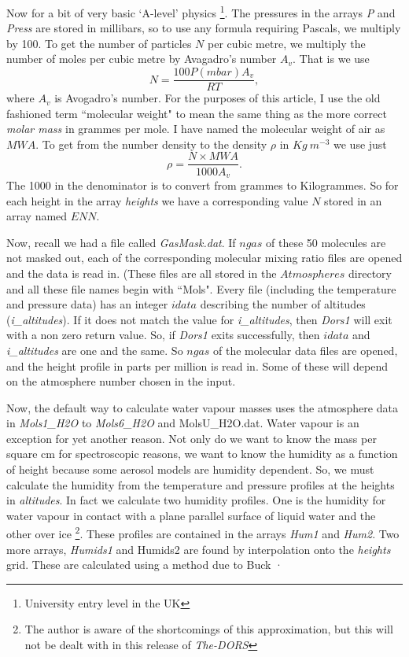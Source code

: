 \documentclass[12pt]{article}
\begin{document}
Now for a bit of very  basic `A-level' physics \footnote[1]{University entry level 
in the UK}.
 The pressures in the arrays {\it P} and {\it Press}  are stored in millibars,
so to use any formula requiring Pascals, we multiply by 100. To get the number of
particles  $N$ per cubic metre, we multiply the number of moles per cubic metre by Avagadro's number $A_v$.
That is we use
\begin{equation}
N= \frac{ 100 P(mbar) A_v}{RT},
\end{equation}
 where $A_v$ is Avogadro's number.
For the purposes of this article, I use the old fashioned term ``molecular weight" to mean
the same thing as the more correct {\it molar mass} in grammes per mole. I have named the
molecular weight of air as $MWA$. To get from the number density to the density $\rho$
 in $Kg \> m^{-3}$ we use just
\begin{equation}
\rho=\frac{N \times MWA}{1000 A_v}.
\end{equation}
The 1000 in the denominator is to convert from grammes to Kilogrammes. So for each height
in the array {\it heights} we have a corresponding value $N$ stored in an array named $ENN$.

Now, recall we had a file called {\it GasMask.dat}. If $ngas$ of these 50 molecules
are not masked out, each of the corresponding molecular mixing ratio files are opened and the
data is read in. (These files are all stored in the $Atmospheres$ directory and all these
file names begin with ``Mols".  Every file (including the temperature and pressure data) has
an integer $idata$ describing the number of altitudes ({\it i\_altitudes}). If it does not match the value
for {\it i\_altitudes}, then {\it Dors1} will exit with a non zero return value. So, if {\it
Dors1} exits successfully, then $idata$ and {\it i\_altitudes} are one and the same.
So $ngas$ of the molecular data files are opened, and the height profile in parts per
million is read in. Some of these will depend on the atmosphere number chosen in the
input. 

Now, the default way to calculate water vapour masses uses the atmosphere data
in {\it Mols1\_H2O} to {\it Mols6\_H2O} and {MolsU\_H2O.dat}. Water vapour
is an exception for yet another reason. Not only do we want to know the mass per square
cm for spectroscopic reasons, we want to know the humidity as a function of height
because some aerosol models are humidity dependent.
 So, we must calculate the humidity from the temperature and pressure
profiles at the heights in {\it altitudes}. In fact we calculate two humidity
profiles. One is the humidity for water vapour in contact with a plane parallel surface
of liquid water and the other over ice \footnote{The author is aware of the shortcomings
of this approximation, but this will not be dealt with in this release of {\it The-DORS}}. These profiles are contained in the arrays {\it Hum1}
and {\it Hum2}. Two more arrays, {\it Humids1} and {Humids2} are found by interpolation
onto the {\it heights} grid. These are calculated using a method due to
Buck \cite{ArdenBuck:Mybib}·
\end{document}
